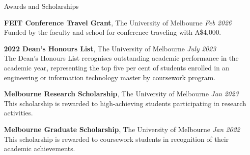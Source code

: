 \documentclass{resume}
\begin{document}
\begin{rSection}{Awards and Scholarships} 

{\bf FEIT Conference Travel Grant}{, The University of Melbourne
} \hfill{\em Feb 2026}
\\ Funded by the faculty and school for conference traveling with A\$4,000.

{\bf 2022 Dean's Honours List}{, The University of Melbourne
} \hfill{\em July 2023}
\\The Dean’s Honours List recognises outstanding academic performance in the academic year, representing the top five
per cent of students enrolled in an engineering or information technology master by coursework program. 

{\bf Melbourne Research Scholarship}{, The University of Melbourne
} \hfill{\em Jan 2023}
\\This scholarship is rewarded to high-achieving students participating in research activities.

{\bf Melbourne Graduate Scholarship}{, The University of Melbourne
} \hfill{\em Jan 2022}
\\This scholarship is rewarded to coursework students in recognition of their academic achievements.

\end{rSection}

    
\end{document}
